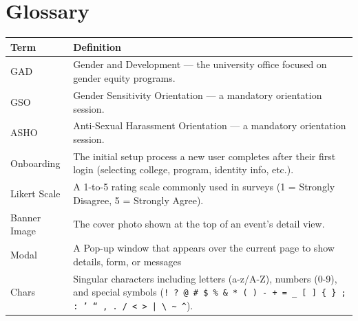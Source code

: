 \documentclass[12pt, a4paper]{article}
\begin{document}
\newpage
\section{Glossary}

\begin{longtable}{|>{\raggedright\arraybackslash}p{4cm}|>{\raggedright\arraybackslash}p{9cm}|}
\hline
\rowcolor{lightgray}
\textbf{Term} & \textbf{Definition} \\
\hline
GAD & Gender and Development — the university office focused on gender equity programs. \\
\hline
GSO & Gender Sensitivity Orientation — a mandatory orientation session. \\
\hline
ASHO & Anti-Sexual Harassment Orientation — a mandatory orientation session. \\
\hline
Onboarding & The initial setup process a new user completes after their first login (selecting college, program, identity info, etc.). \\
\hline
Likert Scale & A 1-to-5 rating scale commonly used in surveys (1 = Strongly Disagree, 5 = Strongly Agree). \\
\hline
Banner Image & The cover photo shown at the top of an event's detail view. \\
\hline
Modal & A Pop-up window that appears over the current page to show details, form, or messages  \\
\hline
Chars & Singular characters including letters (a-z/A-Z), numbers (0-9), and special symbols (\texttt{! ? @ \# \$ \% \& * ( ) - + = \_ [ ] \{ \} ; : ' `` , . / < > | \textbackslash{} \textasciitilde{} \textasciicircum{}}). \\
\hline
\end{longtable}
\end{document}
